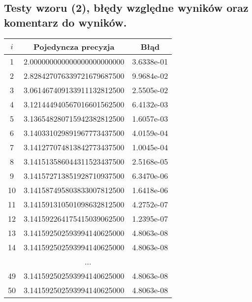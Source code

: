 \documentclass[10pt,wide]{mwart}
\theoremstyle{definition}
\begin{document}
\subsection{Testy wzoru (2), błędy względne wyników oraz komentarz do wyników.}
\begin{minipage}[t]{0.5\textwidth}
\begin{tabular}{|c|c|c|} \hline
    \(i\) & Pojedyncza precyzja & Błąd \\ \hline
    1 & 2.000000000000000000000000 & 3.6338e-01 \\ \hline
    2 & 2.828427076339721679687500 & 9.9684e-02 \\ \hline
    3 & 3.061467409133911132812500 & 2.5505e-02 \\ \hline
    4 & 3.121444940567016601562500 & 6.4132e-03 \\ \hline
    5 & 3.136548280715942382812500 & 1.6057e-03 \\ \hline
    6 & 3.140331029891967773437500 & 4.0159e-04 \\ \hline
    7 & 3.141277074813842773437500 & 1.0045e-04 \\ \hline
    8 & 3.141513586044311523437500 & 2.5168e-05 \\ \hline
    9 & 3.141572713851928710937500 & 6.3470e-06 \\ \hline
    10 & 3.141587495803833007812500 & 1.6418e-06 \\ \hline
    11 & 3.141591310501098632812500 & 4.2752e-07 \\ \hline
    12 & 3.141592264175415039062500 & 1.2395e-07 \\ \hline
    13 & 3.141592502593994140625000 & 4.8063e-08 \\ \hline
    14 & 3.141592502593994140625000 & 4.8063e-08 \\ \hline
    \multicolumn{3}{|c|}{...} \\ \hline
    49 & 3.141592502593994140625000 & 4.8063e-08 \\ \hline
    50 & 3.141592502593994140625000 & 4.8063e-08 \\ \hline
  \end{tabular}
\end{minipage}
\end{document}
